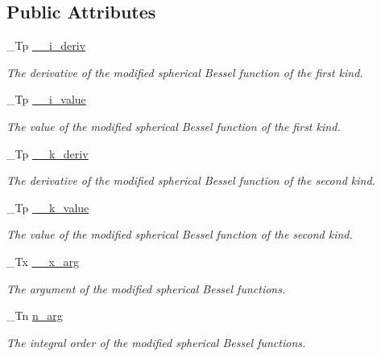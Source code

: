 \subsection*{Public Attributes}
\begin{DoxyCompactItemize}
\item 
\+\_\+\+Tp \hyperlink{struct____gnu__cxx_1_1____sph__mod__bessel__t_a362ea0ef3a2a7e941e3882bb03477f0f}{\+\_\+\+\_\+i\+\_\+deriv}
\begin{DoxyCompactList}\small\item\em The derivative of the modified spherical Bessel function of the first kind. \end{DoxyCompactList}\item 
\+\_\+\+Tp \hyperlink{struct____gnu__cxx_1_1____sph__mod__bessel__t_abecb364caffb1f335806b71c2f729d0d}{\+\_\+\+\_\+i\+\_\+value}
\begin{DoxyCompactList}\small\item\em The value of the modified spherical Bessel function of the first kind. \end{DoxyCompactList}\item 
\+\_\+\+Tp \hyperlink{struct____gnu__cxx_1_1____sph__mod__bessel__t_a4a291581457934e9d05c21e2acbedbc5}{\+\_\+\+\_\+k\+\_\+deriv}
\begin{DoxyCompactList}\small\item\em The derivative of the modified spherical Bessel function of the second kind. \end{DoxyCompactList}\item 
\+\_\+\+Tp \hyperlink{struct____gnu__cxx_1_1____sph__mod__bessel__t_af0e430aef3e7053de5474206d6f13830}{\+\_\+\+\_\+k\+\_\+value}
\begin{DoxyCompactList}\small\item\em The value of the modified spherical Bessel function of the second kind. \end{DoxyCompactList}\item 
\+\_\+\+Tx \hyperlink{struct____gnu__cxx_1_1____sph__mod__bessel__t_ae4a4e05aa107855789a3b5859f9476e9}{\+\_\+\+\_\+x\+\_\+arg}
\begin{DoxyCompactList}\small\item\em The argument of the modified spherical Bessel functions. \end{DoxyCompactList}\item 
\+\_\+\+Tn \hyperlink{struct____gnu__cxx_1_1____sph__mod__bessel__t_afbd56c00f493b7bb6e3fbee5bcd1558d}{n\+\_\+arg}
\begin{DoxyCompactList}\small\item\em The integral order of the modified spherical Bessel functions. \end{DoxyCompactList}\end{DoxyCompactItemize}



